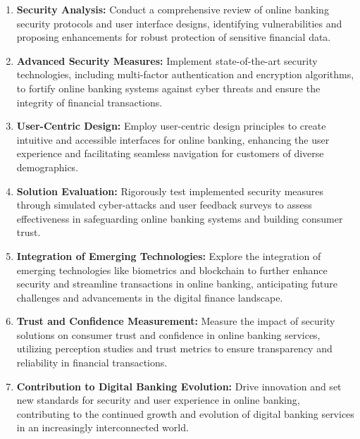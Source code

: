 \documentclass{report}
\begin{document}
\begin{enumerate}
\item \textbf{Security Analysis:} Conduct a comprehensive review of online banking security
protocols and user interface designs, identifying vulnerabilities and proposing
enhancements for robust protection of sensitive financial data.

\item \textbf{Advanced Security Measures:} Implement state-of-the-art security technologies,
including multi-factor authentication and encryption algorithms, to fortify online
banking systems against cyber threats and ensure the integrity of financial
transactions.

\item \textbf{User-Centric Design:} Employ user-centric design principles to create intuitive
and accessible interfaces for online banking, enhancing the user experience and
facilitating seamless navigation for customers of diverse demographics.

\item \textbf{Solution Evaluation:} Rigorously test implemented security measures through
simulated cyber-attacks and user feedback surveys to assess effectiveness in
safeguarding online banking systems and building consumer trust.

\item \textbf{Integration of Emerging Technologies:} Explore the integration of emerging
technologies like biometrics and blockchain to further enhance security and
streamline transactions in online banking, anticipating future challenges and
advancements in the digital finance landscape.

\item \textbf{Trust and Confidence Measurement:} Measure the impact of security solutions
on consumer trust and confidence in online banking services, utilizing perception
studies and trust metrics to ensure transparency and reliability in financial
transactions.

\item \textbf{Contribution to Digital Banking Evolution:} Drive innovation and set new
standards for security and user experience in online banking, contributing to the
continued growth and evolution of digital banking services in an increasingly
interconnected world.
\end{enumerate}
\end{document}
